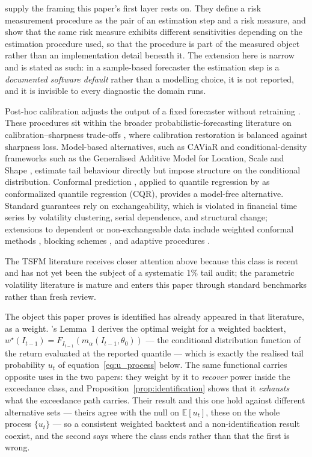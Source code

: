 \documentclass[preprint,11pt,authoryear]{elsarticle}
\newcommand{\E}{\mathbb{E}}
\newcommand{\1}{\boldsymbol{1}}
\begin{document}
\citet{cont2010robustness} supply the framing this paper's first layer rests on. They define a risk measurement procedure as the pair of an estimation step and a risk measure, and show that the same risk measure exhibits different sensitivities depending on the estimation procedure used, so that the procedure is part of the measured object rather than an implementation detail beneath it. The extension here is narrow and is stated as such: in a sample-based forecaster the estimation step is a \emph{documented software default} rather than a modelling choice, it is not reported, and it is invisible to every diagnostic the domain runs.

Post-hoc calibration adjusts the output of a fixed forecaster without retraining \citep{gneiting2013combining,taillardat2016calibrated}. These procedures sit within the broader probabilistic-forecasting literature on calibration--sharpness trade-offs \citep{gneiting2007probabilistic,gneiting2014probabilistic}, where calibration restoration is balanced against sharpness loss. Model-based alternatives, such as CAViaR \citep{engle2004caviar} and conditional-density frameworks such as the Generalised Additive Model for Location, Scale and Shape \citep[GAMLSS;][]{rigby2005generalized}, estimate tail behaviour directly but impose structure on the conditional distribution. Conformal prediction \citep{vovk2005algorithmic}, applied to quantile regression by \citet{romano2019conformalized} as conformalized quantile regression (CQR), provides a model-free alternative. Standard guarantees rely on exchangeability, which is violated in financial time series by volatility clustering, serial dependence, and structural change; extensions to dependent or non-exchangeable data include weighted conformal methods \citep{barber2023conformal}, blocking schemes \citep{chernozhukov2018exact}, and adaptive procedures \citep{zaffran2022conformal,xu2024conformal,angelopoulos2024pid}.

The TSFM literature receives closer attention above because this class is recent and has not yet been the subject of a systematic 1\% tail audit; the parametric volatility literature is mature and enters this paper through standard benchmarks rather than fresh review.

The object this paper proves is identified has already appeared in that
literature, as a weight. \citet{escanciano2012pitfalls}'s Lemma~1 derives the
optimal weight for a weighted backtest,
$w^\star(I_{t-1}) = F_{I_{t-1}}(m_\alpha(I_{t-1},\theta_0))$ --- the conditional
distribution function of the return evaluated at the reported quantile --- which
is exactly the realised tail probability $u_t$ of equation~\eqref{eq:u_process} below.
The same functional carries opposite uses in the two papers: they weight by it to
\emph{recover} power inside the exceedance class, and
Proposition~\ref{prop:identification} shows that it \emph{exhausts} what the
exceedance path carries. Their result and this one hold against different
alternative sets --- theirs agree with the null on $\E[u_t]$, these on the whole
process $\{u_t\}$ --- so a consistent weighted backtest and a non-identification
result coexist, and the second says where the class ends rather than that the
first is wrong.
\end{document}
